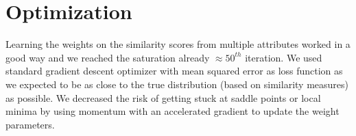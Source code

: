 \section{Optimization}
Learning the weights on the similarity scores from multiple attributes worked in a good way and we reached the saturation already $\approx 50^{th}$ iteration. We used standard gradient descent optimizer with mean squared error as loss function as we expected to be as close to the true distribution (based on similarity measures) as possible. We decreased the risk of getting stuck at saddle points or local minima by using momentum with an accelerated gradient to update the weight parameters.